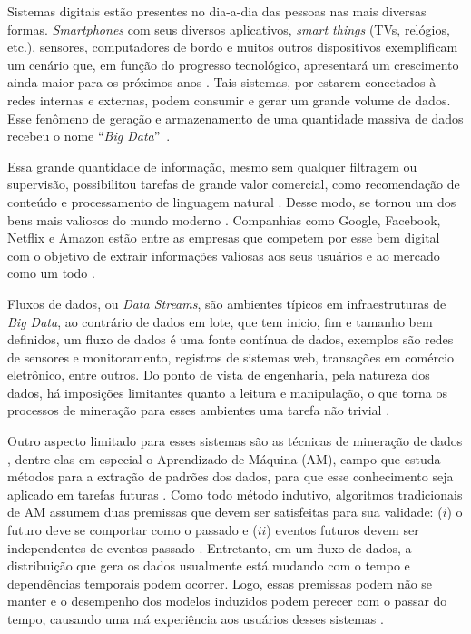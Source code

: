Sistemas digitais estão presentes no dia-a-dia das pessoas nas mais diversas formas. \textit{Smartphones} com seus diversos aplicativos, \textit{smart things} (TVs,
relógios, etc.), sensores, computadores de bordo e muitos outros dispositivos exemplificam um cenário que, em função do progresso tecnológico, apresentará um crescimento ainda maior para os próximos anos \cite{owidtechnologyadoption,atzori2010internet}. Tais sistemas, por estarem conectados à redes
internas e externas, podem consumir e gerar um grande volume de dados. Esse fenômeno de geração e armazenamento de uma quantidade massiva de
dados recebeu o nome ``\textit{Big Data}''~\cite{mcafee2012big, dean2008mapreduce}.

Essa grande quantidade de informação, mesmo sem qualquer filtragem ou supervisão, possibilitou tarefas de grande valor comercial, como recomendação de conteúdo e processamento de linguagem natural \cite{halevy2009unreasonable}. Desse modo, se tornou um dos bens mais valiosos do mundo moderno \cite{economist2017world}. Companhias como Google\regsymbol{}, Facebook\regsymbol{}, Netflix\regsymbol{} e Amazon\regsymbol{} estão entre as empresas que competem por esse bem digital com o objetivo de extrair informações valiosas aos seus usuários e ao mercado como um todo \cite{tarnoff2018big, finger2014data}.

Fluxos de dados, ou \textit{Data Streams}, são ambientes típicos em infraestruturas de \textit{Big Data}, ao contrário de dados em lote, que tem inicio, fim e tamanho bem definidos, um fluxo de dados é uma fonte contínua de dados, exemplos são redes de sensores e monitoramento, registros de sistemas web, transações em comércio eletrônico, entre outros. Do ponto de vista de engenharia, pela natureza dos dados, há imposições limitantes quanto a leitura e manipulação, o que torna os processos de mineração para esses
ambientes uma tarefa não trivial \cite{gama2007learning}.

Outro aspecto limitado para esses sistemas são as técnicas de mineração de dados \cite{gama2007learning}, dentre elas em especial o Aprendizado de Máquina (AM), campo que estuda métodos para a extração de padrões dos dados, para que esse conhecimento seja aplicado em tarefas futuras \cite{mitchell1997machine,friedman2001elements}. Como todo método indutivo, algoritmos tradicionais de AM assumem duas premissas que devem ser satisfeitas para sua validade: ($i$) o futuro deve se comportar como o passado e ($ii$) eventos futuros devem ser independentes de eventos passado \cite{vapnik2013nature}. Entretanto, em um fluxo de dados, a distribuição que gera os dados usualmente está mudando com o tempo e dependências temporais podem ocorrer.  Logo, essas premissas podem não se manter e o desempenho dos modelos induzidos podem perecer com o passar do tempo, causando uma má experiência aos usuários desses sistemas \cite{gama2007learning, Johansson2014}.

